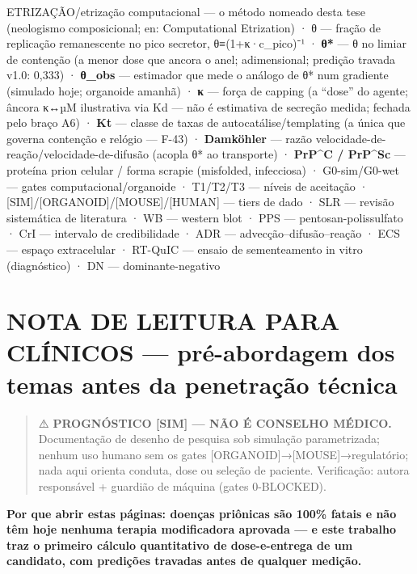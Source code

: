 \documentclass[
  12pt,
]{report}
\begin{document}
ETRIZAÇÃO/etrização computacional --- o método nomeado desta tese
(neologismo composicional; en: Computational Etrization) · θ --- fração
de replicação remanescente no pico secretor, θ≡(1+κ·c\_pico)⁻¹ ·
\textbf{θ*} --- θ no limiar de contenção (a menor dose que ancora o
anel; adimensional; predição travada v1.0: 0,333) · \textbf{θ\_obs} ---
estimador que mede o análogo de θ* num gradiente (simulado hoje;
organoide amanhã) · \textbf{κ} --- força de capping (a ``dose'' do
agente; âncora κ↔µM ilustrativa via Kd --- não é estimativa de secreção
medida; fechada pelo braço A6) · \textbf{Kt} --- classe de taxas de
autocatálise/templating (a única que governa contenção e relógio ---
F-43) · \textbf{Damköhler} --- razão
velocidade-de-reação/velocidade-de-difusão (acopla θ* ao transporte) ·
\textbf{PrP\^{}C / PrP\^{}Sc} --- proteína prion celular / forma scrapie
(misfolded, infecciosa) · G0-sim/G0-wet --- gates
computacional/organoide · T1/T2/T3 --- níveis de aceitação ·
{[}SIM{]}/{[}ORGANOID{]}/{[}MOUSE{]}/{[}HUMAN{]} --- tiers de dado · SLR
--- revisão sistemática de literatura · WB --- western blot · PPS ---
pentosan-polissulfato · CrI --- intervalo de credibilidade · ADR ---
advecção--difusão--reação · ECS --- espaço extracelular · RT-QuIC ---
ensaio de sementeamento in vitro (diagnóstico) · DN ---
dominante-negativo

\hypertarget{nota-de-leitura-para-cluxednicos-pruxe9-abordagem-dos-temas-antes-da-penetrauxe7uxe3o-tuxe9cnica}{%
\section{NOTA DE LEITURA PARA CLÍNICOS --- pré-abordagem dos temas antes
da penetração
técnica}\label{nota-de-leitura-para-cluxednicos-pruxe9-abordagem-dos-temas-antes-da-penetrauxe7uxe3o-tuxe9cnica}}

\begin{quote}
⚠️ \textbf{PROGNÓSTICO {[}SIM{]} --- NÃO É CONSELHO MÉDICO.}
Documentação de desenho de pesquisa sob simulação parametrizada; nenhum
uso humano sem os gates {[}ORGANOID{]}→{[}MOUSE{]}→regulatório; nada
aqui orienta conduta, dose ou seleção de paciente. Verificação: autora
responsável + guardião de máquina (gates 0-BLOCKED).
\end{quote}

\textbf{Por que abrir estas páginas: doenças priônicas são 100\% fatais
e não têm hoje nenhuma terapia modificadora aprovada --- e este trabalho
traz o primeiro cálculo quantitativo de dose-e-entrega de um candidato,
com predições travadas antes de qualquer medição.}
\end{document}
